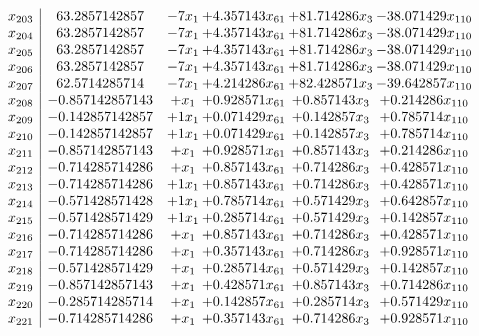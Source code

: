 \documentclass[11pt]{article}
\begin{document}
\[\begin{array}{c| c c@{\hskip 2pt} c@{\hskip 2pt} c@{\hskip 2pt} c@{\hskip 2pt} }
 x_{203}   &  63.2857142857 & -7 x_{1} & + 4.357143 x_{61} & + 81.714286 x_{3} & -38.071429 x_{110}\\
 x_{204}   &  63.2857142857 & -7 x_{1} & + 4.357143 x_{61} & + 81.714286 x_{3} & -38.071429 x_{110}\\
 x_{205}   &  63.2857142857 & -7 x_{1} & + 4.357143 x_{61} & + 81.714286 x_{3} & -38.071429 x_{110}\\
 x_{206}   &  63.2857142857 & -7 x_{1} & + 4.357143 x_{61} & + 81.714286 x_{3} & -38.071429 x_{110}\\
 x_{207}   &  62.5714285714 & -7 x_{1} & + 4.214286 x_{61} & + 82.428571 x_{3} & -39.642857 x_{110}\\
 x_{208}   &  -0.857142857143 & +  x_{1} & + 0.928571 x_{61} & + 0.857143 x_{3} & + 0.214286 x_{110}\\
 x_{209}   &  -0.142857142857 & + 1 x_{1} & + 0.071429 x_{61} & + 0.142857 x_{3} & + 0.785714 x_{110}\\
 x_{210}   &  -0.142857142857 & + 1 x_{1} & + 0.071429 x_{61} & + 0.142857 x_{3} & + 0.785714 x_{110}\\
 x_{211}   &  -0.857142857143 & +  x_{1} & + 0.928571 x_{61} & + 0.857143 x_{3} & + 0.214286 x_{110}\\
 x_{212}   &  -0.714285714286 & +  x_{1} & + 0.857143 x_{61} & + 0.714286 x_{3} & + 0.428571 x_{110}\\
 x_{213}   &  -0.714285714286 & + 1 x_{1} & + 0.857143 x_{61} & + 0.714286 x_{3} & + 0.428571 x_{110}\\
 x_{214}   &  -0.571428571428 & + 1 x_{1} & + 0.785714 x_{61} & + 0.571429 x_{3} & + 0.642857 x_{110}\\
 x_{215}   &  -0.571428571429 & + 1 x_{1} & + 0.285714 x_{61} & + 0.571429 x_{3} & + 0.142857 x_{110}\\
 x_{216}   &  -0.714285714286 & +  x_{1} & + 0.857143 x_{61} & + 0.714286 x_{3} & + 0.428571 x_{110}\\
 x_{217}   &  -0.714285714286 & +  x_{1} & + 0.357143 x_{61} & + 0.714286 x_{3} & + 0.928571 x_{110}\\
 x_{218}   &  -0.571428571429 & +  x_{1} & + 0.285714 x_{61} & + 0.571429 x_{3} & + 0.142857 x_{110}\\
 x_{219}   &  -0.857142857143 & +  x_{1} & + 0.428571 x_{61} & + 0.857143 x_{3} & + 0.714286 x_{110}\\
 x_{220}   &  -0.285714285714 & +  x_{1} & + 0.142857 x_{61} & + 0.285714 x_{3} & + 0.571429 x_{110}\\
 x_{221}   &  -0.714285714286 & +  x_{1} & + 0.357143 x_{61} & + 0.714286 x_{3} & + 0.928571 x_{110}\\

\end{array}\]
\end{document}
